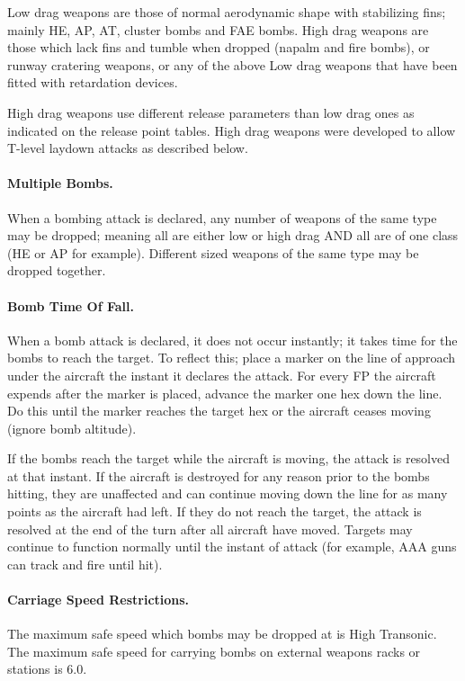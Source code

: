 Low drag weapons are those of normal aerodynamic shape with stabilizing fins; mainly HE, AP, AT, cluster bombs and FAE bombs. High drag weapons are those which lack fins and tumble when dropped (napalm and fire bombs), or runway cratering weapons, or any of the above Low drag weapons that have been fitted with retardation devices.

High drag weapons use different release parameters than low drag ones as indicated on the release point tables. High drag weapons were developed to allow T-level laydown attacks as described below.

\paragraph{Multiple Bombs.} When a bombing attack is declared, any number of weapons of the same type may be dropped; meaning all are either low or high drag AND all are of one class (HE or AP for example). Different sized weapons of the same type may be dropped together.

\paragraph{Bomb Time Of Fall.} When a bomb attack is declared, it does not occur instantly; it takes time for the bombs to reach the target. To reflect this; place a marker on the line of approach under the aircraft the instant it declares the attack. For every FP the aircraft expends after the marker is placed, advance the marker one hex down the line. Do this until the marker reaches the target hex or the aircraft ceases moving (ignore bomb altitude).

If the bombs reach the target while the aircraft is moving, the attack is resolved at that instant. If the aircraft is destroyed for any reason prior to the bombs hitting, they are unaffected and can continue moving down the line for as many points as the aircraft had left. If they do not reach the target, the attack is resolved at the end of the turn after all aircraft have moved.  Targets may continue to function normally until the instant of attack (for example, AAA guns can track and fire until hit).

\paragraph{Carriage Speed Restrictions.} The maximum safe speed which bombs may be dropped at is High Transonic. The maximum safe speed for carrying bombs on external weapons racks or stations is 6.0.

